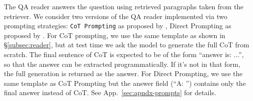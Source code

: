 The QA reader answers the question using retrieved paragraphs taken from the retriever. We consider two versions of the QA reader implemented via two prompting strategies: \texttt{CoT Prompting} as proposed by \citet{cot}, Direct Prompting as proposed by \citet{originalgpt3}. For CoT prompting, we use the same template as shown in \S\ref{subsec:reader}, but at test time we ask the model to generate the full CoT from scratch. The final sentence of CoT is expected to be of the form ``answer is: ...'', so that the answer can be extracted programmatically. If it's not in that form, the full generation is returned as the answer. For Direct Prompting, we use the same template as CoT Prompting but the answer field (``A: '') contains only the final answer instead of CoT. See App.~\ref{sec:apndx-prompts} for details.
